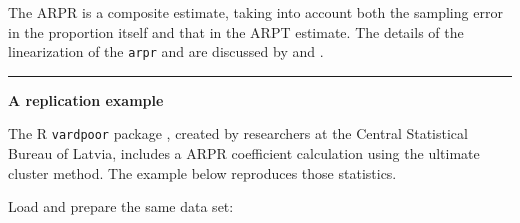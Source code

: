 \documentclass[
]{book}
\begin{document}
The ARPR is a composite estimate, taking into account both the sampling error in the proportion itself and that in the ARPT estimate. The details of the linearization of the \texttt{arpr} and are discussed by \textcite{deville1999} and \textcite{osier2009}.

\begin{center}\rule{0.5\linewidth}{0.5pt}\end{center}

\textbf{A replication example}

The R \texttt{vardpoor} package \autocite{vardpoor}, created by researchers at the Central Statistical Bureau of Latvia, includes a ARPR coefficient calculation using the ultimate cluster method. The example below reproduces those statistics.

Load and prepare the same data set:
\end{document}
